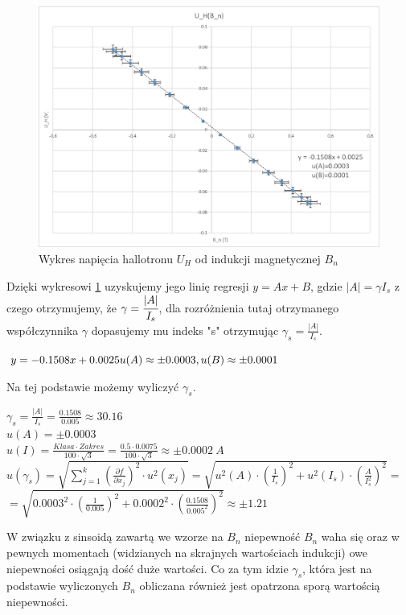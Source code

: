 \documentclass{article}
\begin{document}
\begin{figure}[h]
    \centering
    \includegraphics{U_H_od_B_n.png}
    \caption{Wykres napięcia hallotronu $U_{H}$ od indukcji magnetycznej $B_{n}$ }
    \label{fig: Wykres 3}
\end{figure}{}
Dzięki wykresowi \ref{fig: Wykres 3} uzyskujemy jego linię regresji $y=Ax+B$, gdzie $|A|=\gamma I_{s}$ z czego otrzymujemy, że $\gamma=\cfrac{|A|}{I_{s}}$, dla rozróżnienia tutaj otrzymanego współczynnika $\gamma$ dopasujemy mu indeks "s" otrzymując $\gamma_{s}=\frac{|A|}{I_{s}}$.
\begin{center}
$
    y=-0.1508x+0.0025\\
    u(A)\approx\pm0.0003, u(B)\approx\pm0.0001
$
\end{center}{}
\newpage
Na tej podstawie możemy wyliczyć $\gamma_{s}$.
\begin{center}
    \vspace{2.5ex}
    $\gamma_{s}=\frac{|A|}{I_{s}}=\frac{0.1508}{0.005}\approx30.16$\\
    \vspace{2.5ex}
    $u(A)=\pm0.0003$\\
    \vspace{2.5ex}
    $u(I)=\frac{Klasa\cdot Zakres}{100\cdot \sqrt{3}}=\frac{0.5\cdot0.0075}{100\cdot \sqrt{3}}\approx\pm0.0002 \ A$\\
    \vspace{2.5ex}
    $u(\gamma_{s})=\sqrt{\sum^{k}_{j=1}\left(\frac{\partial f}{\partial x_{j}}\right)^{2}\cdot u^{2}(x_{j})}=\sqrt{u^{2}(A)\cdot\left(\frac{1}{I_{s}}\right)^{2}+u^{2}(I_{s})\cdot(\frac{A}{I_{s}^{2}})^{2}}=$\\
    \vspace{2.5ex}
    $=\sqrt{0.0003^{2}\cdot\left(\frac{1}{0.005}\right)^{2}+0.0002^{2}\cdot(\frac{0.1508}{0.005^{2}})^{2}}  \approx\pm1.21$\\
    \vspace{2.5ex}
\end{center}
W związku z sinsoidą zawartą we wzorze na $B_{n}$ niepewność $B_{n}$ waha się oraz w pewnych momentach (widzianych na skrajnych wartościach indukcji) owe niepewności osiągają dość duże wartości. Co za tym idzie $\gamma_{s}$, która jest na podstawie wyliczonych $B_{n}$ obliczana również jest opatrzona sporą wartością niepewności.\\
\end{document}
